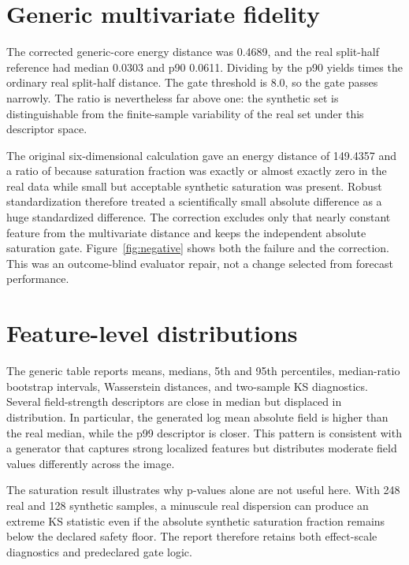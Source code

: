 \documentclass[11pt,oneside]{report}
\begin{document}
\section{Generic multivariate fidelity}

The corrected generic-core energy distance was 0.4689, and the real split-half reference had median 0.0303 and p90 0.0611. Dividing by the p90 yields \AuditDistanceRatio{} times the ordinary real split-half distance. The gate threshold is 8.0, so the gate passes narrowly. The ratio is nevertheless far above one: the synthetic set is distinguishable from the finite-sample variability of the real set under this descriptor space.

The original six-dimensional calculation gave an energy distance of 149.4357 and a ratio of \AuditOriginalDistanceRatio{} because saturation fraction was exactly or almost exactly zero in the real data while small but acceptable synthetic saturation was present. Robust standardization therefore treated a scientifically small absolute difference as a huge standardized difference. The correction excludes only that nearly constant feature from the multivariate distance and keeps the independent absolute saturation gate. Figure~\ref{fig:negative} shows both the failure and the correction. This was an outcome-blind evaluator repair, not a change selected from forecast performance.

\section{Feature-level distributions}

The generic table reports means, medians, 5th and 95th percentiles, median-ratio bootstrap intervals, Wasserstein distances, and two-sample KS diagnostics. Several field-strength descriptors are close in median but displaced in distribution. In particular, the generated log mean absolute field is higher than the real median, while the p99 descriptor is closer. This pattern is consistent with a generator that captures strong localized features but distributes moderate field values differently across the image.

The saturation result illustrates why p-values alone are not useful here. With 248 real and 128 synthetic samples, a minuscule real dispersion can produce an extreme KS statistic even if the absolute synthetic saturation fraction remains below the declared safety floor. The report therefore retains both effect-scale diagnostics and predeclared gate logic.
\end{document}
